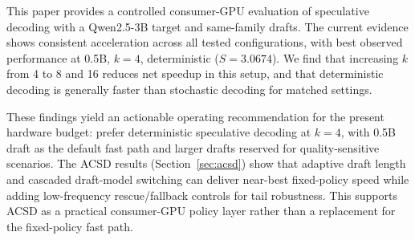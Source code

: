 This paper provides a controlled consumer-GPU evaluation of speculative
decoding with a Qwen2.5-3B target and same-family drafts. The current evidence
shows consistent acceleration across all tested configurations, with best
observed performance at 0.5B, $k{=}4$, deterministic
($S{=}3.0674$). We find that increasing $k$ from 4 to 8 and 16 reduces net
speedup in this setup, and that deterministic decoding is generally faster than
stochastic decoding for matched settings.

These findings yield an actionable operating recommendation for the present
hardware budget: prefer deterministic speculative decoding at $k{=}4$, with
0.5B draft as the default fast path and larger drafts reserved for
quality-sensitive scenarios. The ACSD results (Section~\ref{sec:acsd}) show
that adaptive draft length and cascaded draft-model switching can deliver
near-best fixed-policy speed while adding low-frequency rescue/fallback
controls for tail robustness. This supports ACSD as a practical consumer-GPU
policy layer rather than a replacement for the fixed-policy fast path.
